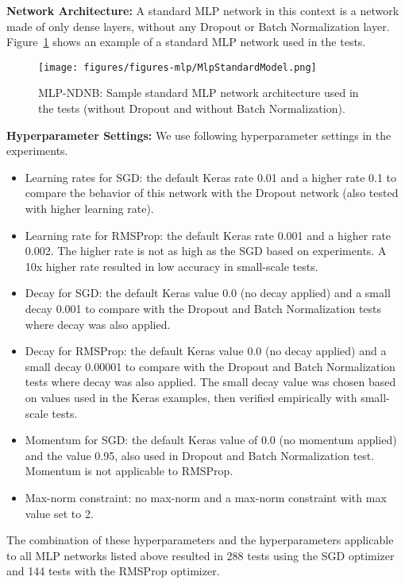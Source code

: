 \documentclass[../dropout-vs-batch-normalization.tex]{subfiles}
\begin{document}
\smallskip
\noindent\textbf{Network Architecture:} A standard MLP network in this context is a network made of only dense layers, without any Dropout or Batch Normalization layer. Figure~\ref{fig:MlpStandardModel} shows an example of a standard MLP network used in the tests.

\begin{figure}
\centerline{\texttt{[image: figures/figures-mlp/MlpStandardModel.png]}}
\caption{MLP-NDNB: Sample standard MLP network architecture used in the tests (without Dropout and without Batch Normalization).}
\label{fig:MlpStandardModel}
\end{figure}

\medskip
\noindent\textbf{Hyperparameter Settings:} We use following hyperparameter settings in the experiments.

\begin{itemize}
\item Learning rates for SGD: the default Keras rate 0.01 and a higher rate 0.1 to compare the behavior of this network with the Dropout network (also tested with higher learning rate).
\item Learning rate for RMSProp: the default Keras rate 0.001 and a higher rate 0.002. The higher rate is not as high as the SGD based on experiments. A 10x higher rate resulted in low accuracy in small-scale tests.
\item Decay for SGD: the default Keras value 0.0 (no decay applied) and a small decay 0.001 to compare with the Dropout and Batch Normalization tests where decay was also applied.
\item Decay for RMSProp: the default Keras value 0.0 (no decay applied) and a small decay 0.00001 to compare with the Dropout and Batch Normalization tests where decay was also applied. The small decay value was chosen based on values used in the Keras examples, then verified empirically with small-scale tests.
\item Momentum for SGD: the default Keras value of 0.0 (no momentum applied) and the value 0.95, also used in Dropout and Batch Normalization test. Momentum is not applicable to RMSProp.
\item Max-norm constraint: no max-norm and a max-norm constraint with max value set to 2.
\end{itemize}

The combination of these hyperparameters and the hyperparameters applicable to all MLP networks listed above resulted in 288 tests using the SGD optimizer and 144 tests with the RMSProp optimizer.
\end{document}
